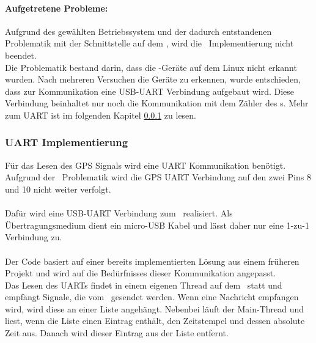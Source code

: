 \paragraph{Aufgetretene Probleme:}
Aufgrund des gewählten Betriebssystem und der dadurch entstandenen Problematik mit der Schnittstelle auf dem \rpi, wird die \iic\ Implementierung nicht beendet.\\
Die Problematik bestand darin, dass die \iic-Geräte auf dem Linux nicht erkannt wurden. Nach mehreren Versuchen die Geräte zu erkennen, wurde entschieden, dass zur Kommunikation eine USB-UART Verbindung aufgebaut wird. Diese Verbindung beinhaltet nur noch die Kommunikation mit dem Zähler des \hwb s. Mehr zum UART ist im folgenden Kapitel \ref{sec:uart} zu lesen.

\clearpage
\subsubsection{UART Implementierung}\label{sec:uart}
Für das Lesen des GPS Signals wird eine UART Kommunikation benötigt.
Aufgrund der \iic\ Problematik wird die GPS UART Verbindung auf den zwei Pins 8 und 10 nicht weiter verfolgt.\\
\\
Dafür wird eine USB-UART Verbindung zum \hwb\ realisiert. Als Übertragungsmedium dient ein micro-USB Kabel und lässt daher nur eine 1-zu-1 Verbindung zu.\\
\\
Der Code basiert auf einer bereits implementierten Lösung aus einem früheren Projekt und wird auf die Bedürfnisses dieser Kommunikation angepasst.\\
Das Lesen des UARTs findet in einem eigenen Thread auf dem \rpi\ statt und empfängt Signale, die vom \hwb\ gesendet werden. Wenn eine Nachricht empfangen wird, wird diese an einer Liste angehängt. Nebenbei läuft der Main-Thread und liest, wenn die Liste einen Eintrag enthält, den Zeitstempel und dessen absolute Zeit aus. Danach wird dieser Eintrag aus der Liste entfernt.